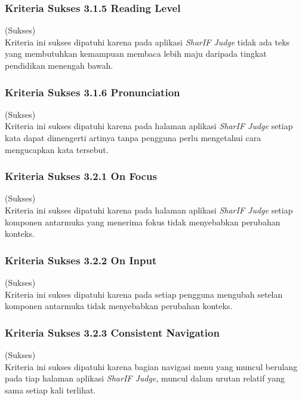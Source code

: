 \subsubsection{Kriteria Sukses 3.1.5 Reading Level}
\label{subsubsec:kepatuhan_kriteria_3.1.5}
(Sukses) \\

Kriteria ini sukses dipatuhi karena pada aplikasi \textit{SharIF Judge} tidak ada teks yang membutuhkan kemampuan membaca lebih maju daripada tingkat pendidikan menengah bawah.

\subsubsection{Kriteria Sukses 3.1.6 Pronunciation}
\label{subsubsec:kepatuhan_kriteria_3.1.6}
(Sukses) \\

Kriteria ini sukses dipatuhi karena pada halaman aplikasi \textit{SharIF Judge} setiap kata dapat dimengerti artinya tanpa pengguna perlu mengetahui cara mengucapkan kata tersebut.

\subsubsection{Kriteria Sukses 3.2.1 On Focus}
\label{subsubsec:kepatuhan_kriteria_3.2.1}
(Sukses) \\

Kriteria ini sukses dipatuhi karena pada halaman aplikasi \textit{SharIF Judge} setiap komponen antarmuka yang menerima fokus tidak menyebabkan perubahan konteks.

\subsubsection{Kriteria Sukses 3.2.2 On Input}
\label{subsubsec:kepatuhan_kriteria_3.2.2}
(Sukses) \\

Kriteria ini sukses dipatuhi karena pada setiap pengguna mengubah setelan komponen antarmuka tidak menyebabkan perubahan konteks.

\subsubsection{Kriteria Sukses 3.2.3 Consistent Navigation}
\label{subsubsec:kepatuhan_kriteria_3.2.3}
(Sukses) \\

Kriteria ini sukses dipatuhi karena bagian navigasi menu yang muncul berulang pada tiap halaman aplikasi \textit{SharIF Judge}, muncul dalam urutan relatif yang sama setiap kali terlihat.

